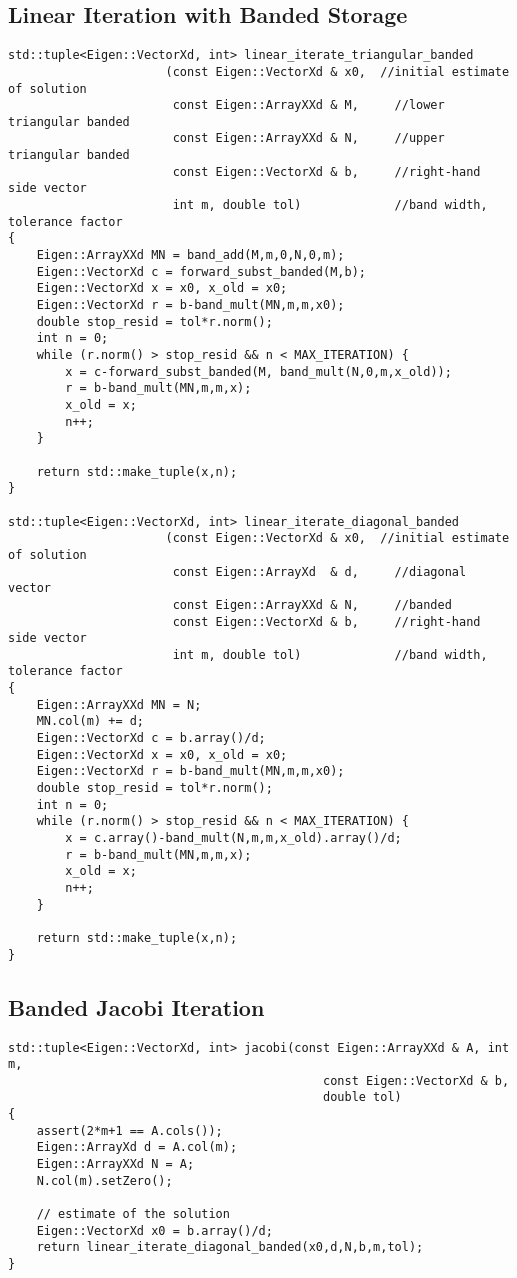 \documentclass[paper=a4, fontsize=11pt]{scrartcl} %
\numberwithin{equation}{section} %
\numberwithin{figure}{section} %
\numberwithin{table}{section} %
\begin{document}
\subsection{Linear Iteration with Banded Storage}
\begin{lstlisting}
std::tuple<Eigen::VectorXd, int> linear_iterate_triangular_banded
                      (const Eigen::VectorXd & x0,  //initial estimate of solution
                       const Eigen::ArrayXXd & M,     //lower triangular banded
                       const Eigen::ArrayXXd & N,     //upper triangular banded
                       const Eigen::VectorXd & b,     //right-hand side vector
                       int m, double tol)             //band width, tolerance factor
{
    Eigen::ArrayXXd MN = band_add(M,m,0,N,0,m);
    Eigen::VectorXd c = forward_subst_banded(M,b);
    Eigen::VectorXd x = x0, x_old = x0;
    Eigen::VectorXd r = b-band_mult(MN,m,m,x0);
    double stop_resid = tol*r.norm();
    int n = 0;
    while (r.norm() > stop_resid && n < MAX_ITERATION) {
        x = c-forward_subst_banded(M, band_mult(N,0,m,x_old));
        r = b-band_mult(MN,m,m,x);
        x_old = x;
        n++;
    }

    return std::make_tuple(x,n);
}

std::tuple<Eigen::VectorXd, int> linear_iterate_diagonal_banded
                      (const Eigen::VectorXd & x0,  //initial estimate of solution
                       const Eigen::ArrayXd  & d,     //diagonal vector
                       const Eigen::ArrayXXd & N,     //banded
                       const Eigen::VectorXd & b,     //right-hand side vector
                       int m, double tol)             //band width, tolerance factor
{
    Eigen::ArrayXXd MN = N;
    MN.col(m) += d;
    Eigen::VectorXd c = b.array()/d;
    Eigen::VectorXd x = x0, x_old = x0;
    Eigen::VectorXd r = b-band_mult(MN,m,m,x0);
    double stop_resid = tol*r.norm();
    int n = 0;
    while (r.norm() > stop_resid && n < MAX_ITERATION) {
        x = c.array()-band_mult(N,m,m,x_old).array()/d;
        r = b-band_mult(MN,m,m,x);
        x_old = x;
        n++;
    }

    return std::make_tuple(x,n);
}
\end{lstlisting}

\subsection{Banded Jacobi Iteration}
\begin{lstlisting}
std::tuple<Eigen::VectorXd, int> jacobi(const Eigen::ArrayXXd & A, int m, 
                                            const Eigen::VectorXd & b, 
                                            double tol)
{
    assert(2*m+1 == A.cols());
    Eigen::ArrayXd d = A.col(m);
    Eigen::ArrayXXd N = A;
    N.col(m).setZero();
    
    // estimate of the solution 
    Eigen::VectorXd x0 = b.array()/d;
    return linear_iterate_diagonal_banded(x0,d,N,b,m,tol);
}
\end{lstlisting}
\end{document}
